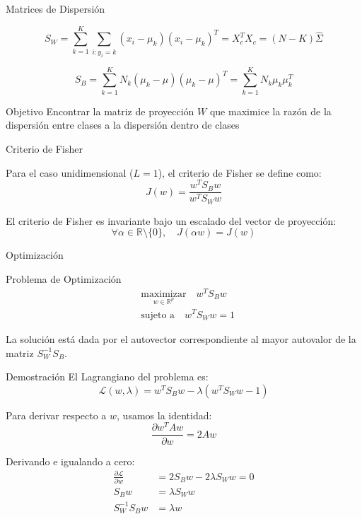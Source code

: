 \documentclass[spanish]{beamer}
\begin{document}
\begin{frame}{Matrices de Dispersión}
\begin{definition}
\[
S_W = \sum_{k=1}^K \sum_{i: y_i = k} (x_i - \mu_k)(x_i - \mu_k)^T = X_c^T X_c = (N - K) \hat{\Sigma}
\]
\end{definition}

\begin{definition}
\[
S_B = \sum_{k=1}^K N_k (\mu_k - \mu)(\mu_k - \mu)^T = \sum_{k=1}^K N_k \mu_k \mu_k^T
\]
\end{definition}

\begin{block}{Objetivo}
Encontrar la matriz de proyección $W$ que maximice la razón de la dispersión entre clases a la dispersión dentro de clases
\end{block}
\end{frame}

\begin{frame}{Criterio de Fisher}
\begin{definition}
Para el caso unidimensional ($L=1$), el criterio de Fisher se define como:
\[
J(w) = \frac{w^T S_B w}{w^T S_W w}
\]
\end{definition}

\begin{theorem}
El criterio de Fisher es invariante bajo un escalado del vector de proyección:
\[
\forall \alpha \in \mathbb{R} \setminus \{0\}, \quad J(\alpha w) = J(w)
\]
\end{theorem}
\end{frame}

\begin{frame}{Optimización}
\begin{block}{Problema de Optimización}
\begin{align*}
& \underset{w \in \mathbb{R}^p}{\mathrm{maximizar}} \quad w^T S_B w \\
& \text{sujeto a} \quad w^T S_W w = 1
\end{align*}
\end{block}

\begin{theorem}
La solución está dada por el autovector correspondiente al mayor autovalor de la matriz $S_W^{-1} S_B$.
\end{theorem}

\end{frame}

\begin{frame}{Demostración}
El Lagrangiano del problema es:
\[
\mathcal{L}(w, \lambda) = w^T S_B w - \lambda(w^T S_W w - 1)
\]

Para derivar respecto a $w$, usamos la identidad:
\[
\frac{\partial w^T A w}{\partial w} = 2Aw
\]

Derivando e igualando a cero:
\begin{align*}
\frac{\partial \mathcal{L}}{\partial w} &= 2S_B w - 2\lambda S_W w = 0 \\
S_B w &= \lambda S_W w \\
S_W^{-1} S_B w &= \lambda w
\end{align*}

\end{frame}
\end{document}
